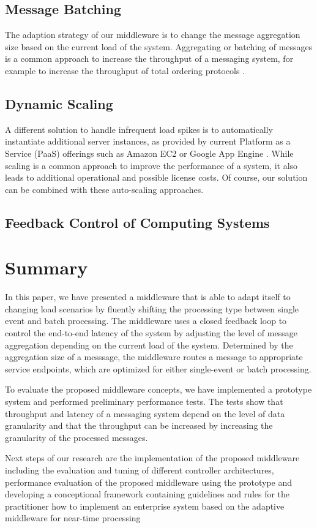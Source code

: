 \subsection{Message Batching}
The adaption strategy of our middleware is to change the message aggregation size based on the current load of the system. Aggregating or batching of messages is a common approach to increase the throughput of a messaging system, for example to increase the throughput of total ordering protocols \citep{Friedman:1997aa} \citep{Friedman:2006aa} \citep{Romano:2012aa} \citep{Didona:2012aa}.


\subsection{Dynamic Scaling}
A different solution to handle infrequent load spikes is to automatically instantiate additional server instances, as provided by current Platform as a Service (PaaS) offerings such as Amazon EC2 \citep{ec2_autoscaling} or Google App Engine \citep{google_cloud_autoscaling}. While scaling is a common approach to improve the performance of a system, it also leads to additional operational and possible license costs. Of course, our solution can be combined with these auto-scaling approaches.

\subsection{Feedback Control of Computing Systems}


\section{Summary}\label{sec:ch5_summary}
In this paper, we have presented a middleware that is able to adapt itself to changing load scenarios by fluently shifting the processing type between single event and batch processing. The middleware uses a closed feedback loop to control the end-to-end latency of the system by adjusting the level of message aggregation depending on the current load of the system. Determined by the aggregation size of a messsage, the middleware routes a message to appropriate service endpoints, which are optimized for either single-event or batch processing.

To evaluate the proposed middleware concepts, we have implemented a prototype system and performed preliminary performance tests. The tests show that throughput and latency of a messaging system depend on the level of data granularity and that the throughput can be increased by increasing the granularity of the processed messages.

Next steps of our research are the implementation of the proposed middleware including the evaluation and tuning of different controller architectures, performance evaluation of the proposed middleware using the prototype and developing a conceptional framework containing guidelines and rules for the practitioner how to implement an enterprise system based on the adaptive middleware for near-time processing
